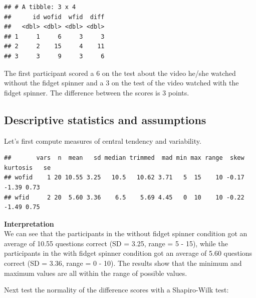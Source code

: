 \documentclass[
]{book}
\newenvironment{Shaded}{\begin{snugshade}}{\end{snugshade}}
\newcommand{\KeywordTok}[1]{\textcolor[rgb]{0.13,0.29,0.53}{\textbf{#1}}}
\newcommand{\NormalTok}[1]{#1}
\newcommand{\OperatorTok}[1]{\textcolor[rgb]{0.81,0.36,0.00}{\textbf{#1}}}
\newcommand{\StringTok}[1]{\textcolor[rgb]{0.31,0.60,0.02}{#1}}
\begin{document}
\begin{verbatim}
## # A tibble: 3 x 4
##      id wofid  wfid  diff
##   <dbl> <dbl> <dbl> <dbl>
## 1     1     6     3     3
## 2     2    15     4    11
## 3     3     9     3     6
\end{verbatim}

The first participant scored a 6 on the test about the video he/she watched without the fidget spinner and a 3 on the test of the video watched with the fidget spinner. The difference between the scores is 3 points.

\hypertarget{descriptive-statistics-and-assumptions}{%
\subsection{Descriptive statistics and assumptions}\label{descriptive-statistics-and-assumptions}}

Let's first compute measures of central tendency and variability.

\begin{Shaded}
\end{Shaded}

\begin{verbatim}
##       vars  n  mean   sd median trimmed  mad min max range  skew kurtosis   se
## wofid    1 20 10.55 3.25   10.5   10.62 3.71   5  15    10 -0.17    -1.39 0.73
## wfid     2 20  5.60 3.36    6.5    5.69 4.45   0  10    10 -0.22    -1.49 0.75
\end{verbatim}

\textbf{Interpretation}\\
We can see that the participants in the without fidget spinner condition got an average of 10.55 questions correct (SD = 3.25, range = 5 - 15), while the participants in the with fidget spinner condition got an average of 5.60 questions correct (SD = 3.36, range = 0 - 10). The results show that the minimum and maximum values are all within the range of possible values.

Next test the normality of the difference scores with a Shapiro-Wilk test:

\begin{Shaded}
\end{Shaded}
\end{document}

